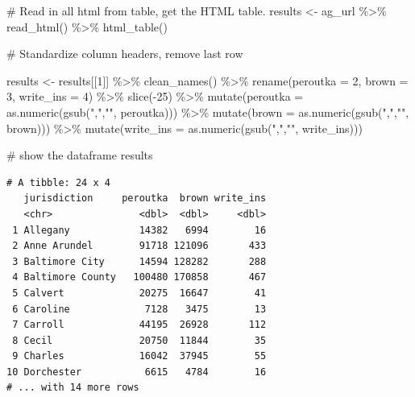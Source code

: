 \documentclass[
  letterpaper,
  DIV=11,
  numbers=noendperiod]{scrreprt}
\newenvironment{Shaded}{\begin{snugshade}}{\end{snugshade}}
\newcommand{\AttributeTok}[1]{\textcolor[rgb]{0.40,0.45,0.13}{#1}}
\newcommand{\CommentTok}[1]{\textcolor[rgb]{0.37,0.37,0.37}{#1}}
\newcommand{\DecValTok}[1]{\textcolor[rgb]{0.68,0.00,0.00}{#1}}
\newcommand{\FunctionTok}[1]{\textcolor[rgb]{0.28,0.35,0.67}{#1}}
\newcommand{\NormalTok}[1]{\textcolor[rgb]{0.00,0.23,0.31}{#1}}
\newcommand{\OtherTok}[1]{\textcolor[rgb]{0.00,0.23,0.31}{#1}}
\newcommand{\SpecialCharTok}[1]{\textcolor[rgb]{0.37,0.37,0.37}{#1}}
\newcommand{\StringTok}[1]{\textcolor[rgb]{0.13,0.47,0.30}{#1}}
\begin{document}
\begin{Shaded}
\begin{Highlighting}[]
\CommentTok{\# Read in all html from table, get the HTML table.}
\NormalTok{results }\OtherTok{\textless{}{-}}\NormalTok{ ag\_url }\SpecialCharTok{\%\textgreater{}\%}
  \FunctionTok{read\_html}\NormalTok{() }\SpecialCharTok{\%\textgreater{}\%}
  \FunctionTok{html\_table}\NormalTok{()}

\CommentTok{\# Standardize column headers, remove last row}

\NormalTok{results }\OtherTok{\textless{}{-}}\NormalTok{ results[[}\DecValTok{1}\NormalTok{]] }\SpecialCharTok{\%\textgreater{}\%}
  \FunctionTok{clean\_names}\NormalTok{() }\SpecialCharTok{\%\textgreater{}\%}
  \FunctionTok{rename}\NormalTok{(}\AttributeTok{peroutka =} \DecValTok{2}\NormalTok{, }\AttributeTok{brown =} \DecValTok{3}\NormalTok{, }\AttributeTok{write\_ins =} \DecValTok{4}\NormalTok{) }\SpecialCharTok{\%\textgreater{}\%}
  \FunctionTok{slice}\NormalTok{(}\SpecialCharTok{{-}}\DecValTok{25}\NormalTok{) }\SpecialCharTok{\%\textgreater{}\%}
  \FunctionTok{mutate}\NormalTok{(}\AttributeTok{peroutka =} \FunctionTok{as.numeric}\NormalTok{(}\FunctionTok{gsub}\NormalTok{(}\StringTok{","}\NormalTok{,}\StringTok{""}\NormalTok{, peroutka))) }\SpecialCharTok{\%\textgreater{}\%}
  \FunctionTok{mutate}\NormalTok{(}\AttributeTok{brown =} \FunctionTok{as.numeric}\NormalTok{(}\FunctionTok{gsub}\NormalTok{(}\StringTok{","}\NormalTok{,}\StringTok{""}\NormalTok{, brown))) }\SpecialCharTok{\%\textgreater{}\%}
  \FunctionTok{mutate}\NormalTok{(}\AttributeTok{write\_ins =} \FunctionTok{as.numeric}\NormalTok{(}\FunctionTok{gsub}\NormalTok{(}\StringTok{","}\NormalTok{,}\StringTok{""}\NormalTok{, write\_ins)))}

\CommentTok{\# show the dataframe}
\NormalTok{results}
\end{Highlighting}
\end{Shaded}

\begin{verbatim}
# A tibble: 24 x 4
   jurisdiction     peroutka  brown write_ins
   <chr>               <dbl>  <dbl>     <dbl>
 1 Allegany            14382   6994        16
 2 Anne Arundel        91718 121096       433
 3 Baltimore City      14594 128282       288
 4 Baltimore County   100480 170858       467
 5 Calvert             20275  16647        41
 6 Caroline             7128   3475        13
 7 Carroll             44195  26928       112
 8 Cecil               20750  11844        35
 9 Charles             16042  37945        55
10 Dorchester           6615   4784        16
# ... with 14 more rows
\end{verbatim}
\end{document}
